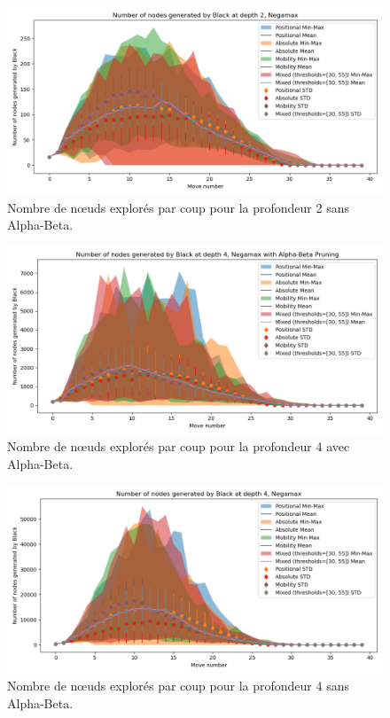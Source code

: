 \begin{figure}[H]
    \centering
    \includegraphics[width=1\textwidth]{ressources/Number of nodes generated by Black_depth_2_Negamax.png}
    \caption{Nombre de nœuds explorés par coup pour la profondeur 2 sans Alpha-Beta.}
    \label{fig:node_explored_negamax}
\end{figure}

\begin{figure}[H]
    \centering
    \includegraphics[width=1\textwidth]{ressources/Number of nodes generated by Black_depth_4_Negamax with Alpha-Beta Pruning.png}
    \caption{Nombre de nœuds explorés par coup pour la profondeur 4 avec Alpha-Beta.}
    \label{fig:node_explored_alpha_beta_4}
\end{figure}

\begin{figure}[H]
    \centering
    \includegraphics[width=1\textwidth]{ressources/Number of nodes generated by Black_depth_4_Negamax.png}
    \caption{Nombre de nœuds explorés par coup pour la profondeur 4 sans Alpha-Beta.}
    \label{fig:node_explored_negamax_4}
\end{figure}

